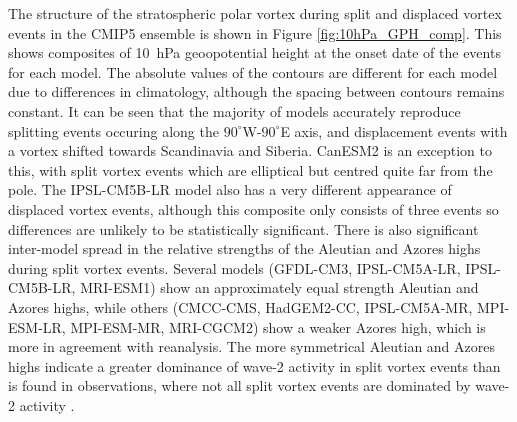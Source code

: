 The structure of the stratospheric polar vortex during split and displaced
vortex events in the CMIP5 ensemble is shown in Figure
\ref{fig:10hPa_GPH_comp}. This shows composites of 10~hPa geoopotential height
at the onset date of the events for each model. The absolute values of the
contours are different for each model due to differences in climatology,
although the spacing between contours remains constant. It can be seen that the
majority of models accurately reproduce splitting events occuring along the
$90^{\circ}$W-$90^{\circ}$E axis, and displacement events with a vortex shifted
towards Scandinavia and Siberia. CanESM2 is an exception to this, with split
vortex events which are elliptical but centred quite far from the pole. The
IPSL-CM5B-LR model also has a very different appearance of displaced vortex
events, although this composite only consists of three events so differences are
unlikely to be statistically significant. There is also significant inter-model
spread in the relative strengths of the Aleutian and Azores highs during split
vortex events. Several models (GFDL-CM3, IPSL-CM5A-LR, IPSL-CM5B-LR, MRI-ESM1)
show an approximately equal strength Aleutian and Azores highs, while others
(CMCC-CMS, HadGEM2-CC, IPSL-CM5A-MR, MPI-ESM-LR, MPI-ESM-MR, MRI-CGCM2) show a
weaker Azores high, which is more in agreement with reanalysis. The more
symmetrical Aleutian and Azores highs indicate a greater dominance of wave-2
activity in split vortex events than is found in observations, where not all
split vortex events are dominated by wave-2 activity \citep{Mitchell2013}. 

